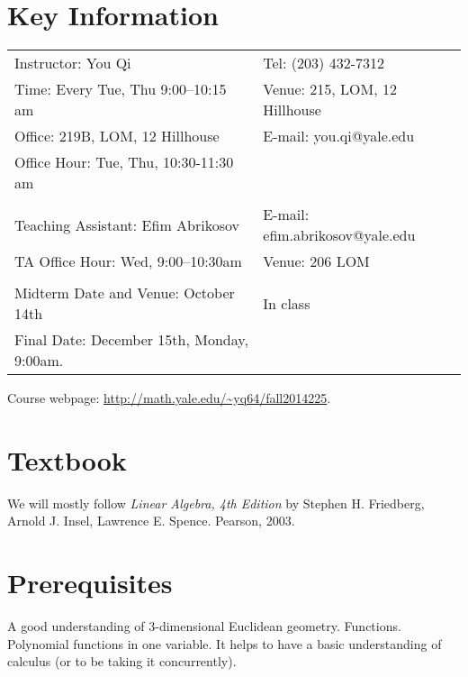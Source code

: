 \documentclass[margin,line]{res}
\begin{document}

\begin{resume}

\section{\sc Key Information}
\vspace{.05in}
\begin{tabular}{@{}p{3.4in}p{4in}}
 Instructor: You Qi            & Tel: (203) 432-7312   \\
Time: Every Tue, Thu 9:00--10:15 am & Venue: 215, LOM, 12 Hillhouse\\
Office: 219B, LOM, 12 Hillhouse   & E-mail:  you.qi@yale.edu \\
Office Hour: Tue, Thu, 10:30-11:30 am &\\
& \\
Teaching Assistant: Efim Abrikosov & E-mail: efim.abrikosov@yale.edu\\
TA Office Hour: Wed, 9:00--10:30am  & Venue: 206 LOM\\
& \\
Midterm Date and Venue: October 14th & In class\\
Final Date: December 15th, Monday, 9:00am.
\end{tabular}
Course webpage: \url{http://math.yale.edu/~yq64/fall2014225}.

\section{\sc Textbook}
We will mostly follow \emph{Linear Algebra, 4th Edition}
by Stephen H. Friedberg, Arnold J. Insel, Lawrence E. Spence. Pearson, 2003.

\section{\sc Prerequisites}
A good understanding of 3-dimensional Euclidean geometry. Functions. Polynomial functions in one variable. It helps to have a basic understanding of calculus (or to be taking it concurrently).



\end{resume}
\end{document}
